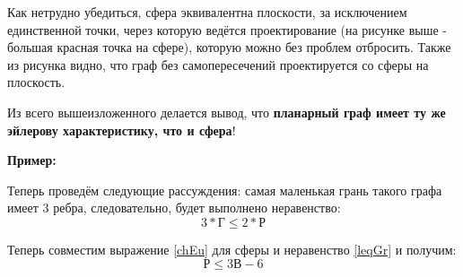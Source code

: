 Как нетрудно убедиться, сфера эквивалентна плоскости, за исключением единственной точки, через которую ведётся проектирование (на рисунке выше - большая красная точка на сфере), которую можно без проблем отбросить. Также из рисунка видно, что граф без самопересечений проектируется со сферы на плоскость.

Из всего вышеизложенного делается вывод, что \textbf{планарный граф имеет ту же эйлерову характеристику, что и сфера}!

\textbf{Пример:}


Теперь проведём следующие рассуждения: самая маленькая грань такого графа имеет 3 ребра, следовательно, будет выполнено неравенство:
\begin{equation}\label{leqGr}
    3*Г \leq 2*Р
\end{equation}

Теперь совместим выражение \ref{chEu} для сферы и неравенство \ref{leqGr} и получим:
\begin{equation}\label{necPlan}
    Р \leq 3В - 6
\end{equation}

